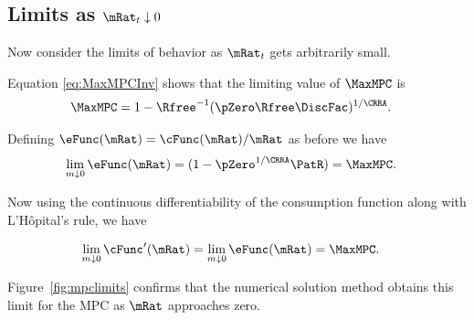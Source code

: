 \documentclass[BufferStockTheory]{subfiles}
\begin{document}
\hypertarget{LimitsAsmtToZero}{}
\subsection{Limits as $\mRat_t \downarrow 0$}

\label{subsec:LimitsAsmtToZero} Now consider the limits of behavior as $\mRat_{t}$ gets
arbitrarily small.

Equation \eqref{eq:MaxMPCInv} shows that the limiting value of
$\MaxMPC$ is
\begin{align}
  \MaxMPC  & = 1-{\Rfree}^{-1}(\pZero  \Rfree\DiscFac)^{1/\CRRA}. \nonumber
\end{align}

Defining $\eFunc(\mRat)=\cFunc(\mRat)/\mRat$ as before we have
\begin{align}
  \lim_{m \downarrow 0} \eFunc(\mRat)  & = (1-\pZero^{1/\CRRA}\PatR) = \MaxMPC \nonumber.
\end{align}

Now using the continuous differentiability of the consumption function
along with L'H\^opital's rule, we have

\begin{align}
  \lim_{m \downarrow 0} \cFunc^{\prime}(\mRat)  & = \lim_{m \downarrow 0}
                                                  \eFunc(\mRat) = \MaxMPC. \nonumber
\end{align}

Figure~\ref{fig:mpclimits} confirms that the numerical solution method
obtains this limit for the MPC as $\mRat$ approaches zero.
\end{document}
